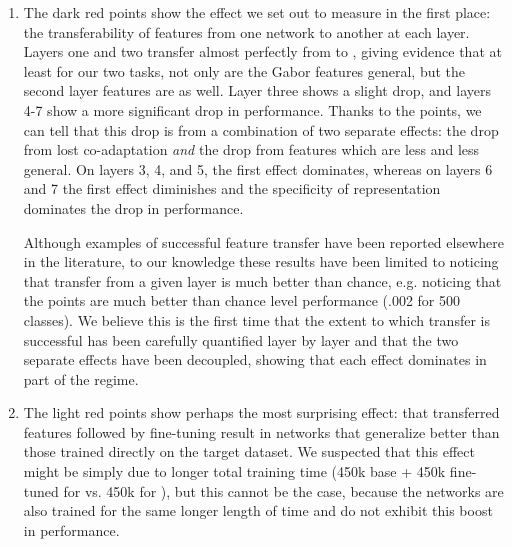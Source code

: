 \begin{enumerate}
\item The dark red  points show the effect we set out to measure in the first place: the transferability of features from one network to another at each layer. Layers one and two transfer almost perfectly from  to  , giving evidence that at least for our two tasks, not only are the Gabor features general, but the second layer features are as well. Layer three shows a slight drop, and layers 4-7 show a more significant drop in performance. Thanks to the  points, we can tell that this drop is from a combination of two separate effects: the drop from lost co-adaptation \emph{and} the drop from features which are less and less general. On layers 3, 4, and 5, the first effect dominates, whereas on layers 6 and 7 the first effect diminishes and the specificity of representation dominates the drop in performance.

Although examples of successful feature transfer have been reported elsewhere in the literature, to our knowledge these results have been limited to noticing that transfer from a given layer is much better than chance, e.g. noticing that the  points are much better than chance level performance (.002 for 500 classes). We believe this is the first time that the extent to which transfer is successful has been carefully quantified layer by layer and that the two separate effects have been decoupled, showing that each effect dominates in part of the regime.

\item The light red  points show perhaps the most surprising effect: that transferred features followed by fine-tuning result in networks that generalize better than those trained directly on the target dataset. We suspected that this effect might be simply due to longer total training time (450k base + 450k fine-tuned for  vs. 450k for ), but this cannot be the case, because the  networks are also trained for the same longer length of time and do not exhibit this boost in performance.


\end{enumerate}
